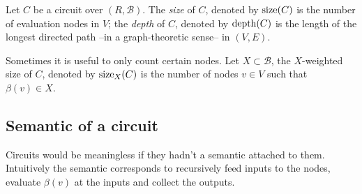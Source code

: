 \begin{definition}
  \label{def:size}
  Let $C$ be a circuit over $(R,\mathcal{B})$. The
  \emph{size} of $C$, denoted by
  $\operatorname{size}(C)$ is the number of
  evaluation nodes in $V$; the
  \emph{depth} of $C$, denoted by
  $\operatorname{depth}(C)$ is the length of the longest directed path
  --in a graph-theoretic sense-- in $(V,E)$.

  Sometimes it is useful to only count certain nodes. Let
  $X\subset\mathcal{B}$, the
  $X$-weighted size of $C$,
  denoted by $\operatorname{size}_X(C)$ is the number of nodes $v\in V$ such that
  $\beta(v)\in X$.
\end{definition}


\subsection{Semantic of a circuit}
\label{sec:semantic-circuit}
Circuits would be meaningless if they hadn't a semantic attached to
them. Intuitively the semantic corresponds to recursively feed inputs
to the nodes, evaluate $\beta(v)$ at the inputs and collect the
outputs.


